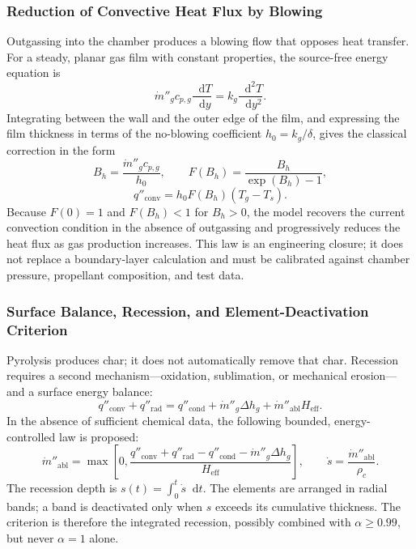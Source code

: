 \documentclass[oneside,openany]{amsdtx}
\newcommand{\dd}{\mathop{}\!\mathrm{d}}
\begin{document}
\subsubsection{Reduction of Convective Heat Flux by Blowing}

Outgassing into the chamber produces a blowing flow that opposes heat transfer.
For a steady, planar gas film with constant properties, the source-free energy
equation is
\begin{equation}
  \dot m''_g c_{p,g}\frac{\dd T}{\dd y}
  =k_g\frac{\dd^2T}{\dd y^2}.
\end{equation}
Integrating between the wall and the outer edge of the film, and expressing the
film thickness in terms of the no-blowing coefficient \(h_0=k_g/\delta\), gives
the classical correction in the form
\begin{equation}
  B_h=\frac{\dot m''_g c_{p,g}}{h_0},\qquad
  F(B_h)=\frac{B_h}{\exp(B_h)-1},
\end{equation}
\begin{equation}
  \boxed{q''_\mathrm{conv}=h_0F(B_h)(T_g-T_s).}
  \label{eq:blowing}
\end{equation}
Because \(F(0)=1\) and \(F(B_h)<1\) for \(B_h>0\), the model recovers the
current convection condition in the absence of outgassing and progressively
reduces the heat flux as gas production increases. This law is an engineering
closure; it does not replace a boundary-layer calculation and must be calibrated
against chamber pressure, propellant composition, and test data.

\subsubsection{Surface Balance, Recession, and Element-Deactivation Criterion}

Pyrolysis produces char; it does not automatically remove that char. Recession
requires a second mechanism---oxidation, sublimation, or mechanical erosion---
and a surface energy balance:
\begin{equation}
  q''_\mathrm{conv}+q''_\mathrm{rad}
  =q''_\mathrm{cond}+\dot m''_g\Delta h_g
   +\dot m''_\mathrm{abl}H_\mathrm{eff}.
  \label{eq:surface-balance}
\end{equation}
In the absence of sufficient chemical data, the following bounded,
energy-controlled law is proposed:
\begin{equation}
  \dot m''_\mathrm{abl}=
  \max\left[0,
  \frac{q''_\mathrm{conv}+q''_\mathrm{rad}-q''_\mathrm{cond}
  -\dot m''_g\Delta h_g}{H_\mathrm{eff}}\right],
  \qquad
  \dot s=\frac{\dot m''_\mathrm{abl}}{\rho_c}.
  \label{eq:recession}
\end{equation}
The recession depth is \(s(t)=\int_0^t\dot s\dd t\). The  elements
are arranged in radial bands; a band is deactivated only when \(s\) exceeds its
cumulative thickness. The criterion is therefore the integrated recession,
possibly combined with \(\alpha\ge0.99\), but never \(\alpha=1\) alone.
\end{document}

